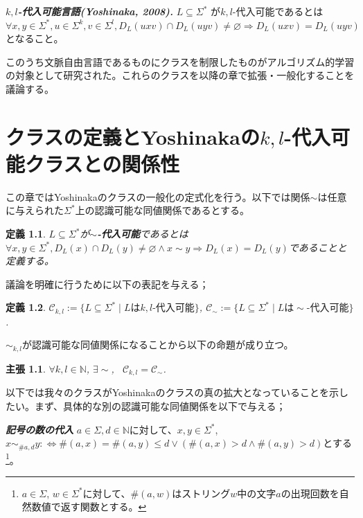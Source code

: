 \documentclass{jsbook}
\renewcommand{\emptyset}{\varnothing}
\newtheorem{definition}{定義}
\newtheorem{claim}{主張}
\begin{document}
\begin{flushleft}
\emph{\bf{$k,l$-代入可能言語(Yoshinaka, 2008).}}
$L\subseteq\Sigma^*$ が$k,l$-代入可能であるとは$\forall x,y\in\Sigma^*,u\in\Sigma^k,v\in\Sigma^l,D_L(uxv)\cap D_L(uyv)\neq\emptyset\Rightarrow D_L(uxv)=D_L(uyv)$となること。
\end{flushleft}

このうち文脈自由言語であるものにクラスを制限したものがアルゴリズム的学習の対象として研究された。これらのクラスを以降の章で拡張・一般化することを議論する。


\chapter{クラスの定義とYoshinakaの$k,l$-代入可能クラスとの関係性}

この章ではYoshinaka\cite{Yoshinaka:2008}のクラスの一般化の定式化を行う。以下では関係$\sim$は任意に与えられた$\Sigma^*$上の認識可能な同値関係であるとする。

\begin{definition}
$L\subseteq\Sigma^*$が{\bf $\sim$-代入可能}であるとは$\forall x,y\in\Sigma^*,D_L(x)\cap D_L(y)\neq\emptyset\land x\sim y\Rightarrow D_L(x)=D_L(y)$であることと定義する。
\end{definition}

議論を明確に行うために以下の表記を与える；

\begin{definition}
$\mathcal{C}_{k,l}:=\{L\subseteq\Sigma^*\mid L \mbox{は} k,l\mbox{-代入可能}\}$, $\mathcal{C}_{\sim}:=\{L\subseteq\Sigma^*\mid  L \mbox{は} \sim\mbox{-代入可能}\}$.
\end{definition}


$\sim_{k,l}$が認識可能な同値関係になることから以下の命題が成り立つ。

\begin{claim}
$\forall k,l\in\mathbb{N}$, $\exists\sim$, \ $\mathcal{C}_{k,l}=\mathcal{C}_{\sim}$.
\end{claim}


以下では我々のクラスがYoshinakaのクラスの真の拡大となっていることを示したい。まず、具体的な別の認識可能な同値関係を以下で与える；

\emph{\bf{記号の数の代入}} $a\in\Sigma,d\in\mathbb{N}$に対して、$x,y\in\Sigma^*$, $x\sim_{\#a,d}y:\Leftrightarrow \#(a,x)=\#(a,y)\leq d\lor (\#(a,x)>d\land \#(a,y)>d)$とする\footnote{$a\in\Sigma$, $w\in\Sigma^*$に対して、$\#(a,w)$はストリング$w$中の文字$a$の出現回数を自然数値で返す関数とする。}。
\end{document}
